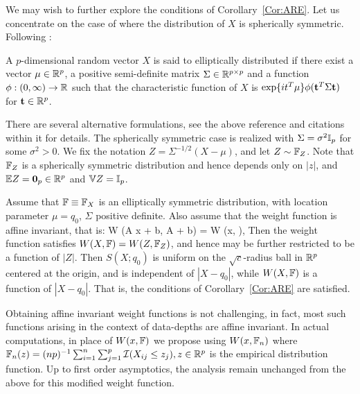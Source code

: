 We may wish to further explore the conditions of Corollary~\ref{Cor:ARE}. 
Let us concentrate on the case of where the distribution of $X$ is spherically symmetric. Following \cite{ref:Fangetal90_Book}:

\begin{Definition}
A $p$-dimensional random vector $X$ is said to elliptically distributed if there exist a vector $\mu \in {\mathbb{R}}^p$, a positive semi-definite matrix $\Sigma \in {\mathbb{R}}^{p \times p}$ and a function 
$\phi: (0, \infty) \rightarrow {\mathbb{R}}$ such that the characteristic function of $X$ is $\exp \{ i t^{T} \mu \} \phi ({\bf{t}}^T \Sigma {\bf{t}})$ for ${\bf{t}} \in {\mathbb{R}}^p$.
\end{Definition}

There are several alternative formulations, see the above reference and citations within it for details. The spherically symmetric case is realized with $\Sigma = \sigma^{2} {\mathbb{I}}_{p}$ for some 
$\sigma^{2} > 0$. 
We fix the notation $Z = \Sigma^{-1/2} (X - \mu)$, and let 
$Z \sim {\mathbb{F}}_{Z}$. Note that ${\mathbb{F}}_{Z}$ is a spherically symmetric distribution and hence
depends only on $|z|$, and  ${\mathbb{E}} Z = \mathbf{0}_{p} \in {\mathbb{R}}^{p}$ and ${\mathbb{V}} Z = {\mathbb{I}}_{p}$.

\begin{Corollary}
\label{Cor:Elliptic_ARE}
Assume that ${\mathbb{F}} \equiv {\mathbb{F}}_X$ is an elliptically symmetric distribution, with location parameter $\mu = q_{0}$, $\Sigma$ positive definite. Also assume that the weight function is affine invariant, that is:
\ban
W (A x + b, A \BF + b) = W (x, \BF),
\ean
Then  the weight function satisfies $W (X, {\mathbb{F}}) = W (Z, {\mathbb{F}}_{Z})$, and hence may be further restricted to be a function of $|Z|$. Then $S (X; q_0)$ is uniform on the $\sqrt c$-radius ball 
in ${\mathbb{R}}^{p}$ centered at the origin, and is independent of $|X - q_{0}|$, while $W (X, {\mathbb{F}})$ is a function of  $|X - q_{0}|$. That is, the conditions of Corollary~\ref{Cor:ARE} are satisfied. 
\end{Corollary}

Obtaining affine invariant weight functions is not challenging, in fact, most 
such functions arising in the context of data-depths are affine invariant. 
In actual computations, in place of $W (x, {\mathbb{F}})$ we propose 
using $W (x, {\mathbb{F}}_{n})$ where
$ {\mathbb{F}}_{n}(z) = (np)^{-1} \sum_{i = 1}^{n} \sum_{j=1}^p
\mathcal{I} (X_{ij} \leq z_j ), z \in {\mathbb{R}}^p
$ is the empirical distribution function. Up to first order asymptotics, the analysis remain unchanged from the above for this modified weight function.

